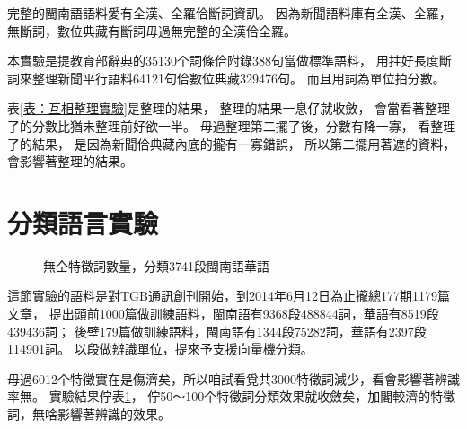 完整的閩南語語料愛有全漢、全羅佮斷詞資訊。
因為新聞語料庫有全漢、全羅，無斷詞，數位典藏有斷詞毋過無完整的全漢佮全羅。

本實驗是提教育部辭典的35130个詞條佮附錄388句當做標準語料，
用拄好長度斷詞來整理新聞平行語料64121句佮數位典藏329476句。
而且用詞為單位拍分數。

表\ref{表：互相整理實驗}是整理的結果，
整理的結果一息仔就收斂，
會當看著整理了的分數比猶未整理前好欲一半。
毋過整理第二擺了後，分數有降一寡，
看整理了的結果，
是因為新聞佮典藏內底的攏有一寡錯誤，
所以第二擺用著遮的資料，
會影響著整理的結果。



\section{分類語言實驗}
\label{節：判斷語言實驗}

\begin{figure}
\caption{無仝特徵詞數量，分類3741段閩南語華語}
\label{圖：無仝特徵詞數量對分類閩南語華語效果的影響}
\end{figure}

這節實驗的語料是對TGB通訊創刊開始，到2014年6月12日為止攏總177期1179篇文章，
提出頭前1000篇做訓練語料，閩南語有9368段488844詞，華語有8519段439436詞；
後壁179篇做訓練語料，閩南語有1344段75282詞，華語有2397段114901詞。
以段做辨識單位，提來予支援向量機分類。

毋過6012个特徵實在是傷濟矣，所以咱試看覓共3000特徵詞減少，看會影響著辨識率無。
實驗結果佇表\ref{圖：無仝特徵詞數量對分類閩南語華語效果的影響}，
佇50～100个特徵詞分類效果就收斂矣，加閣較濟的特徵詞，無啥影響著辨識的效果。

